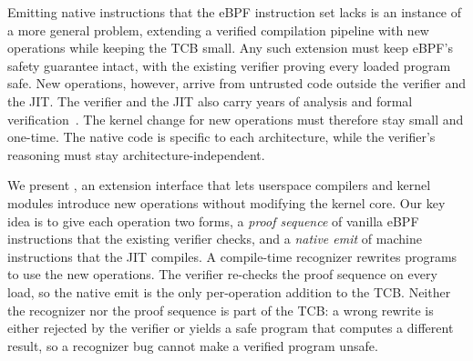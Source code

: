 Emitting native instructions that the eBPF instruction set lacks is an instance of a more general problem, extending a verified compilation pipeline with new operations while keeping the TCB small.
Any such extension must keep eBPF's safety guarantee intact, with the existing verifier proving every loaded program safe.
New operations, however, arrive from untrusted code outside the verifier and the JIT.
The verifier and the JIT also carry years of analysis and formal verification~\cite{nelson2020specification,vishwanathan2023verifying}.
The kernel change for new operations must therefore stay small and one-time.
The native code is specific to each architecture, while the verifier's reasoning must stay architecture-independent.

We present \tool, an extension interface that lets userspace compilers and kernel modules introduce new operations without modifying the kernel core.
Our key idea is to give each operation two forms, a \emph{proof sequence} of vanilla eBPF instructions that the existing verifier checks, and a \emph{native emit} of machine instructions that the JIT compiles.
A compile-time recognizer rewrites programs to use the new operations.
The verifier re-checks the proof sequence on every load, so the native emit is the only per-operation addition to the TCB.
Neither the recognizer nor the proof sequence is part of the TCB: a wrong rewrite is either rejected by the verifier or yields a safe program that computes a different result, so a recognizer bug cannot make a verified program unsafe.

